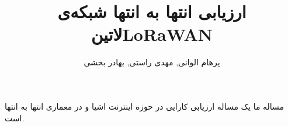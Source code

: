 \documentclass{IEEEtran}
\title{ارزیابی انتها به انتها شبکه‌ی \متن‌لاتین{LoRaWAN}}
\author{پرهام الوانی, مهدی راستی, بهادر بخشی}
\begin{document}
\maketitle


مساله ما یک مساله ارزیابی کارایی در حوزه اینترنت اشیا و در معماری انتها به انتها است.
\end{document}
